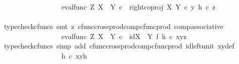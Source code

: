 \begin{isabellebody}
\ \ \ \ \ \ \ \ \ \ \ \ \isamarkupfalse%
\ \isamarkupfalse%
\ {\isachardoublequoteopen}{\isachardot}{\kern0pt}{\isachardot}{\kern0pt}{\isachardot}{\kern0pt}\ {\isacharequal}{\kern0pt}\ eval{\isacharunderscore}{\kern0pt}func\ Z\ {\isacharparenleft}{\kern0pt}X\ {\isasymCoprod}\ Y{\isacharparenright}{\kern0pt}\ {\isasymcirc}\isactrlsub c\ \ {\isasymlangle}right{\isacharunderscore}{\kern0pt}coproj\ X\ Y\ {\isasymcirc}\isactrlsub c\ y{\isacharcomma}{\kern0pt}\ h\ {\isasymcirc}\isactrlsub c\ z{\isasymrangle}{\isachardoublequoteclose}\isanewline
\ \ \ \ \ \ \ \ \ \ \ \ \ \ \isamarkupfalse%
\ {\isacharparenleft}{\kern0pt}typecheck{\isacharunderscore}{\kern0pt}cfuncs{\isacharcomma}{\kern0pt}\ smt\ {\isacharparenleft}{\kern0pt}z{}{\isacharparenright}{\kern0pt}\ cfunc{\isacharunderscore}{\kern0pt}cross{\isacharunderscore}{\kern0pt}prod{\isacharunderscore}{\kern0pt}comp{\isacharunderscore}{\kern0pt}cfunc{\isacharunderscore}{\kern0pt}prod\ comp{\isacharunderscore}{\kern0pt}associative{}{\isacharparenright}{\kern0pt}\isanewline
\ \ \ \ \ \ \ \ \ \ \ \ \isamarkupfalse%
\ \isamarkupfalse%
\ {\isachardoublequoteopen}{\isachardot}{\kern0pt}{\isachardot}{\kern0pt}{\isachardot}{\kern0pt}\ {\isacharequal}{\kern0pt}\ eval{\isacharunderscore}{\kern0pt}func\ Z\ {\isacharparenleft}{\kern0pt}X\ {\isasymCoprod}\ Y{\isacharparenright}{\kern0pt}\ {\isasymcirc}\isactrlsub c\ \ {\isacharparenleft}{\kern0pt}{\isacharparenleft}{\kern0pt}id{\isacharparenleft}{\kern0pt}X\ {\isasymCoprod}\ Y{\isacharparenright}{\kern0pt}\ {\isasymtimes}\isactrlsub f\ h{\isacharparenright}{\kern0pt}\ {\isasymcirc}\isactrlsub c\ {\isasymlangle}xy{\isacharcomma}{\kern0pt}z{\isasymrangle}{\isacharparenright}{\kern0pt}{\isachardoublequoteclose}\isanewline
\ \ \ \ \ \ \ \ \ \ \ \ \ \ \isamarkupfalse%
\ {\isacharparenleft}{\kern0pt}typecheck{\isacharunderscore}{\kern0pt}cfuncs{\isacharcomma}{\kern0pt}\ simp\ add{\isacharcolon}{\kern0pt}\ cfunc{\isacharunderscore}{\kern0pt}cross{\isacharunderscore}{\kern0pt}prod{\isacharunderscore}{\kern0pt}comp{\isacharunderscore}{\kern0pt}cfunc{\isacharunderscore}{\kern0pt}prod\ id{\isacharunderscore}{\kern0pt}left{\isacharunderscore}{\kern0pt}unit{}\ xy{\isacharunderscore}{\kern0pt}def{\isacharparenright}{\kern0pt}\isanewline
\ \ \ \ \ \ \ \ \ \ \ \ \isamarkupfalse%
\ \isamarkupfalse%
\ {\isachardoublequoteopen}{\isachardot}{\kern0pt}{\isachardot}{\kern0pt}{\isachardot}{\kern0pt}\ {\isacharequal}{\kern0pt}\ h\isactrlsup {\isasymflat}\ {\isasymcirc}\isactrlsub c\ xyh{\isachardoublequoteclose}\isanewline

\end{isabellebody}
